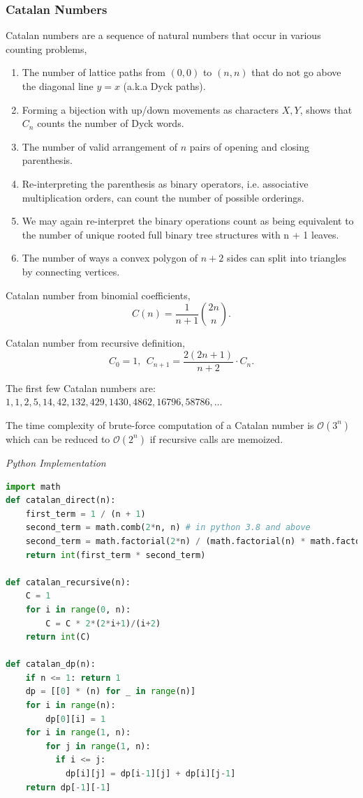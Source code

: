 \documentclass{article}
\newcommand{\bigO}{\mathcal{O}}
\begin{document}
    \subsubsection{Catalan Numbers}
    Catalan numbers are a sequence of natural numbers that occur in various counting problems,
    \begin{enumerate}
        \item The number of lattice paths from $(0, 0)$ to $(n, n)$ that do not go above the diagonal line $y = x$ (a.k.a Dyck paths).
        
        \item Forming a bijection with up/down movements as characters $X, Y$, shows that $C_n$ counts the number of Dyck words.
        
        \item The number of valid arrangement of $n$ pairs of opening and closing parenthesis.
        
        \item Re-interpreting the parenthesis as binary operators, i.e. associative multiplication orders, can count the number of possible orderings. 
        
        \item We may again re-interpret the binary operations count as being equivalent to the number of unique rooted full binary tree structures with n + 1 leaves.
        
        \item The number of ways a convex polygon of $n+2$ sides can split into triangles by connecting vertices.
    \end{enumerate}
    Catalan number from binomial coefficients,
    \[
        C(n) = \frac{1}{n+1}\binom{2n}{n}.
    \]
    
    Catalan number from recursive definition,
    \[
    C_0 = 1,\ \ C_{n+1} = \frac{2(2n+1)}{n+2} \cdot C_n. 
    \]
    
    The first few Catalan numbers are: $1, 1, 2, 5, 14, 42, 132, 429, 1430, 4862, 16796, 58786, \dots$ 
    
    The time complexity of brute-force computation of a Catalan number is $\bigO(3^n)$ which can be reduced to $\bigO(2^n)$ if recursive calls are memoized.

\vspace{8pt} \emph{Python Implementation}
\begin{lstlisting}[language=Python]
import math  
def catalan_direct(n):
    first_term = 1 / (n + 1)
    second_term = math.comb(2*n, n) # in python 3.8 and above
    second_term = math.factorial(2*n) / (math.factorial(n) * math.factorial(2*n-n))
    return int(first_term * second_term)

def catalan_recursive(n):
    C = 1
    for i in range(0, n):
        C = C * 2*(2*i+1)/(i+2)
    return int(C)

def catalan_dp(n):
    if n <= 1: return 1
    dp = [[0] * (n) for _ in range(n)] 
    for i in range(n):
        dp[0][i] = 1
    for i in range(1, n):
        for j in range(1, n):
          if i <= j: 
            dp[i][j] = dp[i-1][j] + dp[i][j-1]
    return dp[-1][-1] 
\end{lstlisting}
\end{document}
